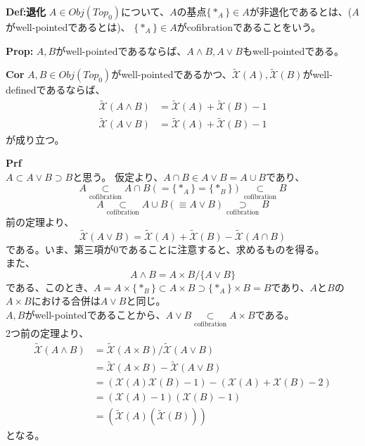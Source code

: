 \documentclass[a4paper,11pt]{jsarticle}
\numberwithin{equation}{section}
\begin{document}
\begin{itembox}[l]{\textbf{Def:退化}}
  $A \in Obj(Top_0)$について、$A$の基点$\{*_A\} \in A $が非退化であるとは、($A$がwell-pointedであるとは)、
  $\{*_A\} \in A$がcofibrationであることをいう。
\end{itembox}

\begin{itembox}[l]{\textbf{Prop:}}
  $A,B$がwell-pointedであるならば、$A \wedge B, A \vee B$もwell-pointedである。
\end{itembox}

\begin{itembox}[l]{\textbf{Cor}}
  $A,B \in Obj(Top_0)$がwell-pointedであるかつ、$\tilde{\mathcal{X}}(A), \tilde{\mathcal{X}}(B)$がwell-definedであるならば、
  \begin{align}
    \tilde{\mathcal{X}}(A \wedge B) &= \tilde{\mathcal{X}}(A) + \tilde{\mathcal{X}}(B) -1\\
    \tilde{\mathcal{X}}(A \vee B) &= \tilde{\mathcal{X}}(A) + \tilde{\mathcal{X}}(B) -1
  \end{align}
  が成り立つ。
\end{itembox}
\textbf{Prf}\\
$A \subset A \vee B \supset B$と思う。
仮定より、$A \cap B \in A \vee B = A \cup B$であり、
\begin{equation}
  A \underset{\text{cofibration}}{\subset} A \cap B(=\{*_A\} = \{*_B\}) \underset{\text{cofibration}}{\subset} B
\end{equation}
\begin{equation}
  A \underset{\text{cofibration}}{\subset} A \cup B(\equiv A \vee B) \underset{\text{cofibration}}{\supset} B
\end{equation}
前の定理より、
\begin{equation}
  \tilde{\mathcal{X}}(A \vee B) = \tilde{\mathcal{X}}(A) + \tilde{\mathcal{X}}(B) - \tilde{\mathcal{X}}(A \cap B)
\end{equation}
である。いま、第三項が0であることに注意すると、求めるものを得る。\\
また、
\begin{equation}
  A \wedge B = A \times B / \{A \vee B\} 
\end{equation}
である、このとき、$A = A \times \{*_B\} \subset A \times B \supset \{*_A\} \times B = B$であり、$A$と$B$の$A \times B$における合併は$A \vee B$と同じ。\\
$A,B$がwell-pointedであることから、$A \vee B \underset{\text{cofibration}}{\subset} A \times B$である。\\
2つ前の定理より、
\begin{align}
  \tilde{\mathcal{X}}(A \wedge B) &= \tilde{\mathcal{X}}(A \times B) / \tilde{\mathcal{X}}(A \vee B)\\
  &= \tilde{\mathcal{X}}(A \times B) - \tilde{\mathcal{X}}(A \vee B)\\
  &= ({\mathcal{X}}(A) {\mathcal{X}}(B) - 1) - ({\mathcal{X}}(A) + {\mathcal{X}}(B) -2)\\
  &= ({\mathcal{X}}(A)-1)(\mathcal{X}(B)-1)\\
  &= (\tilde{\mathcal{X}}(A)(\tilde{\mathcal{X}}(B)))
\end{align}
となる。\\
\end{document}
